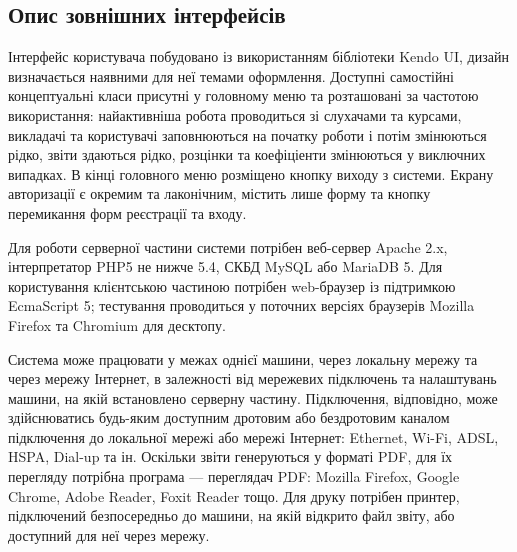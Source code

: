 \bigbreak
\subsection{Опис зовнішних інтерфейсів}
\bigbreak
Інтерфейс користувача побудовано із використанням бібліотеки Kendo UI, дизайн визначається наявними для неї темами оформлення. Доступні самостійні концептуальні класи присутні у головному меню та розташовані за частотою використання: найактивніша робота проводиться зі слухачами та курсами, викладачі та користувачі заповнюються на початку роботи і потім змінюються рідко, звіти здаються рідко, розцінки та коефіціенти змінюються у виключних випадках. В кінці головного меню розміщено кнопку виходу з системи. Екрану авторизації є окремим та лаконічним, містить лише форму та кнопку перемикання форм реєстрації та входу.

Для роботи серверної частини системи потрібен веб-сервер Apache 2.x, інтерпретатор PHP5 не нижче 5.4, СКБД MySQL або MariaDB 5. Для користування клієнтською частиною потрібен web-браузер із підтримкою EcmaScript 5; тестування проводиться у поточних версіях браузерів Mozilla Firefox та Chromium для десктопу.

Система може працювати у межах однієї машини, через локальну мережу та через мережу Інтернет, в залежності від мережевих підключень та налаштувань машини, на якій встановлено серверну частину. Підключення, відповідно, може здійснюватись будь-яким доступним дротовим або бездротовим каналом підключення до локальної мережі або мережі Інтернет: Ethernet, Wi-Fi, ADSL, HSPA, Dial-up та ін. Оскільки звіти генеруються у форматі PDF, для їх перегляду потрібна програма --- переглядач PDF: Mozilla Firefox, Google Chrome, Adobe Reader, Foxit Reader тощо. Для друку потрібен принтер, підключений безпосередньо до машини, на якій відкрито файл звіту, або доступний для неї через мережу.
\FloatBarrier
